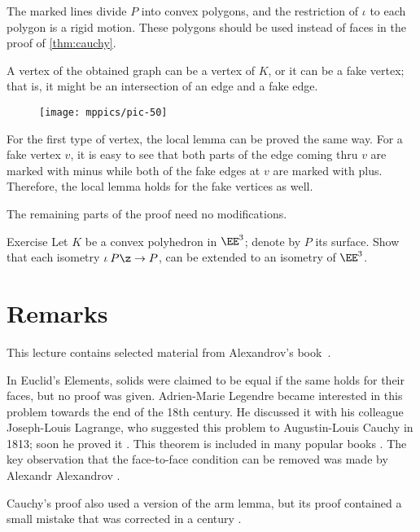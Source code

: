 The marked lines divide $P$ into convex polygons, and the restriction of $\iota$ to each polygon is a rigid motion.
These polygons should be used instead of faces in the proof of \ref{thm:cauchy}.

A vertex of the obtained graph can be a vertex of $K$, or it can be a fake vertex;
that is, it might be an intersection of an edge and a fake edge.

\begin{figure}[ht!]
\vskip-0mm
\centering
\texttt{[image: mppics/pic-50]}
\vskip-0mm
\end{figure}

For the first type of vertex, the local lemma can be proved the same way.
For a fake vertex $v$, it is easy to see that both parts of the edge coming thru $v$ are marked with minus
while both of the fake edges at $v$ are marked with plus.
Therefore, the local lemma holds for the fake vertices as well.

The remaining parts of the proof need no modifications.
\qeds

\begin{thm}{Exercise}\label{pr:K-P-simmetry}
Let $K$ be a convex polyhedron in $\EE^3$;
denote by $P$ its surface.
Show that each isometry $\iota\:P\z\to P$,
can be extended to an isometry of $\EE^3$.
\end{thm}


\section{Remarks}

This lecture contains selected material from Alexandrov's book~\cite{alexandrov}.

In Euclid's Elements, 
solids were claimed to be equal if the same holds for their faces, but no proof was given.
Adrien-Marie Legendre became interested in this problem towards the end of the 18th century.
He discussed it with his colleague Joseph-Louis Lagrange, who suggested this problem to Augustin-Louis Cauchy in 1813; soon he proved it \cite{cauchy}.
This theorem is included in many popular books \cite{aigner-zigler,dolbilin,tabacnikov-fuks}.
The key observation that the face-to-face condition can be removed was made by
Alexandr Alexandrov \cite{alexandrov-1941}.

Cauchy's proof \cite{cauchy}
also used a version of the arm lemma, but its proof contained a small mistake that was corrected in a century \cite{sabitov}.

